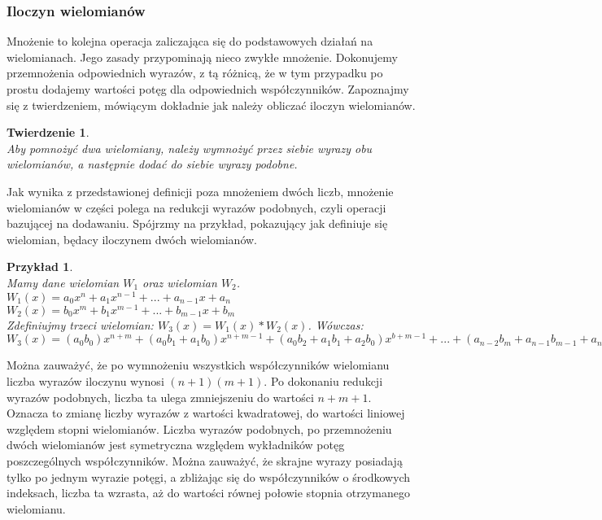 \documentclass[twoside,a4paper]{book}
\newtheorem{theorem}{Twierdzenie}
\newtheorem{example}{Przykład}
\begin{document}
\subsubsection{Iloczyn wielomianów}

Mnożenie to kolejna operacja zaliczająca się do podstawowych działań na wielomianach. Jego zasady przypominają nieco zwykłe mnożenie. Dokonujemy przemnożenia odpowiednich wyrazów, z tą różnicą, że w tym przypadku po prostu dodajemy wartości potęg dla odpowiednich współczynników. Zapoznajmy się z twierdzeniem, mówiącym dokładnie jak należy obliczać iloczyn wielomianów.

\begin{theorem}
	$ $\\
	Aby pomnożyć dwa wielomiany, należy wymnożyć przez siebie wyrazy obu wielomianów, a następnie dodać do siebie wyrazy podobne.
\end{theorem}

Jak wynika z przedstawionej definicji poza mnożeniem dwóch liczb, mnożenie wielomianów w części polega na redukcji wyrazów podobnych, czyli operacji bazującej na dodawaniu. Spójrzmy na przykład, pokazujący jak definiuje się wielomian, będacy iloczynem dwóch wielomianów.

\begin{example}
$ $\\
	Mamy dane wielomian $W_1$ oraz wielomian $W_2$. \\
$W_1(x) = a_0x^n + a_1x^{n-1} + ... + a_{n-1}x + a_n$ \\
$W_2(x) = b_0x^m + b_1x^{m-1} + ... + b_{m-1}x + b_m$ \\
	Zdefiniujmy trzeci wielomian: $W_3(x) = W_1(x) * W_2(x)$. Wówczas: \\
$W_3(x) = (a_0b_0)x^{n+m} + (a_0b_1+a_1b_0)x^{n+m-1} + (a_0b_2+a_1b_1+a_2b_0)x^{b+m-1} + ... + (a_{n-2}b_m+a_{n-1}b_{m-1}+a_nb_{m-2})x^2 + (a_{n-1}b_m + a_nb_{m-1})x + a_nb_m$
\end{example}

Można zauważyć, że po wymnożeniu wszystkich współczynników wielomianu liczba wyrazów iloczynu wynosi $(n+1)(m+1)$. Po dokonaniu redukcji wyrazów podobnych, liczba ta ulega zmniejszeniu do wartości $n+m+1$. Oznacza to zmianę liczby wyrazów z wartości kwadratowej, do wartości liniowej względem stopni wielomianów. Liczba wyrazów podobnych, po przemnożeniu dwóch wielomianów jest symetryczna względem wykładników potęg poszczególnych współczynników. Można zauważyć, że skrajne wyrazy posiadają tylko po jednym wyrazie potęgi, a zbliżając się do współczynników o środkowych indeksach, liczba ta wzrasta, aż do wartości równej połowie stopnia otrzymanego wielomianu.
\end{document}
